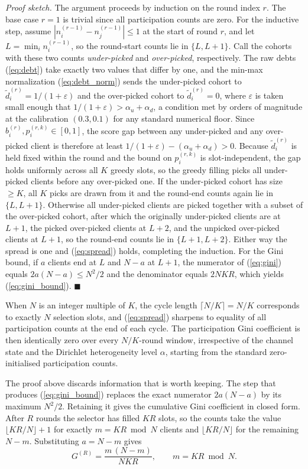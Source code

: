 \documentclass[journal]{IEEEtran}
\newcommand{\revIVE}[1]{#1}
\newcommand{\rev}[1]{#1}
\begin{document}
\textit{Proof sketch.} The argument proceeds by induction on the round index $r$. The base case $r = 1$ is trivial since all participation counts are zero. For the inductive step, assume $|n_i^{(r-1)} - n_j^{(r-1)}| \le 1$ at the start of round $r$, and let $L = \min_i n_i^{(r-1)}$, so the round-start counts lie in $\{L, L+1\}$. Call the cohorts with these two counts \emph{under-picked} and \emph{over-picked}, respectively. The raw debts (\ref{eq:debt}) take exactly two values that differ by one, and the min-max normalization (\ref{eq:debt_norm}) sends the under-picked cohort to $\tilde{d}_i^{(r)} = 1/(1+\varepsilon)$ and the over-picked cohort to $\tilde{d}_i^{(r)} = 0$, \revIVE{where $\varepsilon$ is taken small enough that $1/(1+\varepsilon) > \alpha_u + \alpha_d$, a condition met by orders of magnitude at the calibration $(0.3, 0.1)$ for any standard numerical floor.} Since $b_i^{(r)}, p_i^{(r,k)} \in [0,1]$, the score gap between any under-picked and any over-picked client is therefore at least $1/(1+\varepsilon) - (\alpha_u + \alpha_d) > 0$. \revIVE{Because $\tilde{d}_i^{(r)}$ is held fixed within the round and the bound on $p_i^{(r,k)}$ is slot-independent, the gap holds uniformly across all $K$ greedy slots,} so the greedy filling picks all under-picked clients before any over-picked one. If the under-picked cohort has size $\ge K$, all $K$ picks are drawn from it and the round-end counts again lie in $\{L, L+1\}$. Otherwise all under-picked clients are picked together with a subset of the over-picked cohort, after which the originally under-picked clients are at $L+1$, the picked over-picked clients at $L+2$, and the unpicked over-picked clients at $L+1$, so the round-end counts lie in $\{L+1, L+2\}$. Either way the spread is one and (\ref{eq:spread}) holds, completing the induction. For the Gini bound, if $a$ clients end at $L$ and $N-a$ at $L+1$, the numerator of (\ref{eq:gini}) equals $2a(N-a) \le N^2/2$ and the denominator equals $2NKR$, which yields (\ref{eq:gini_bound}). \hfill$\blacksquare$

When $N$ is an integer multiple of $K$, the cycle length $\lceil N/K \rceil = N/K$ corresponds to exactly $N$ selection slots, and (\ref{eq:spread}) sharpens to equality of all participation counts at the end of each cycle. The participation Gini coefficient is then identically zero over every $N/K$-round window, irrespective of the channel state and the Dirichlet heterogeneity level $\alpha$, starting from the standard zero-initialised participation counts.

\rev{The proof above discards information that is worth keeping. The step that produces (\ref{eq:gini_bound}) replaces the exact numerator $2a(N-a)$ by its maximum $N^2/2$. Retaining it gives the cumulative Gini coefficient in closed form. After $R$ rounds the selector has filled $KR$ slots, so the counts take the value $\lfloor KR/N \rfloor + 1$ for exactly $m = KR \bmod N$ clients and $\lfloor KR/N \rfloor$ for the remaining $N-m$. Substituting $a = N-m$ gives}
\begin{equation}
\rev{G^{(R)} = \frac{m\,(N-m)}{N K R}, \qquad m = KR \bmod N .}
\label{eq:gini_exact}
\end{equation}
\end{document}

